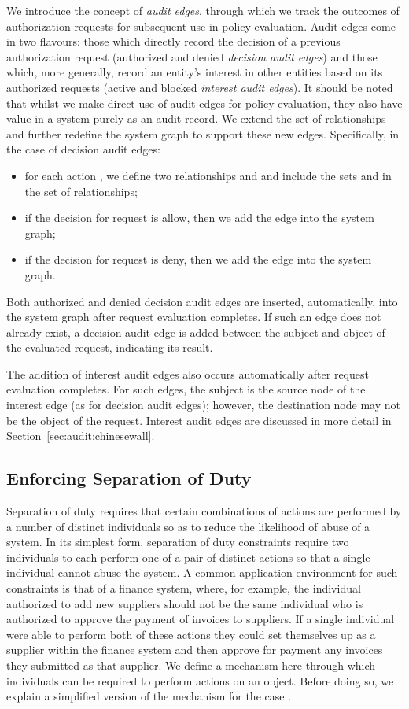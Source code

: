 \documentclass{article}
\begin{document}
We introduce the concept of \emph{audit edges}, through which we track the outcomes of authorization requests for subsequent use in policy evaluation.
Audit edges come in two flavours: those which directly record the decision of a previous authorization request (authorized and denied \emph{decision audit edges}) and those which, more generally, record an entity's interest in other entities based on its authorized requests (active and blocked \emph{interest audit edges}).
It should be noted that whilst we make direct use of audit edges for policy evaluation, they also have value in a system purely as an audit record.
We extend the set of relationships and further redefine the system graph to support these new edges.
Specifically, in the case of decision audit edges:
\begin{itemize}
    \item for each action , we define two relationships  and  and include the sets  and  in the set of relationships;
    \item if the decision for request  is allow, then we add the edge  into the system graph;
    \item if the decision for request  is deny, then we add the edge  into the system graph.
\end{itemize}

Both authorized and denied decision audit edges are inserted, automatically, into the system graph after request evaluation completes.
If such an edge does not already exist, a decision audit edge is added between the subject and object of the evaluated request, indicating its result.

The addition of interest audit edges also occurs automatically after request evaluation completes.
For such edges, the subject is the source node of the interest edge (as for decision audit edges); however, the destination node may not be the object of the request.
Interest audit edges are discussed in more detail in Section~\ref{sec:audit:chinesewall}.

\subsection{Enforcing Separation of Duty}\label{sec:audit:sod}
Separation of duty requires that certain combinations of actions are performed by a number of distinct individuals so as to reduce the likelihood of abuse of a system.
In its simplest form, separation of duty constraints require two individuals to each perform one of a pair of distinct actions so that a single individual cannot abuse the system.
A common application environment for such constraints is that of a finance system, where, for example, the individual authorized to add new suppliers should not be the same individual who is authorized to approve the payment of invoices to suppliers.
If a single individual were able to perform both of these actions they could set themselves up as a supplier within the finance system and then approve for payment any invoices they submitted as that supplier.
We define a mechanism here through which  individuals can be required to perform  actions on an object.
Before doing so, we explain a simplified version of the mechanism for the case .
\end{document}
